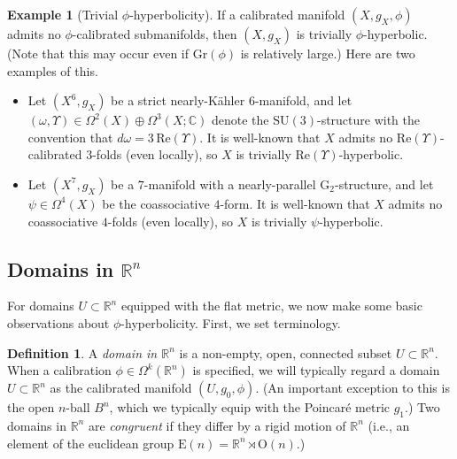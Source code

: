 \documentclass[11pt]{article}
\newcommand{\SU}{\mathrm{SU}}
\newcommand{\G}{\mathrm{G}}
\newcommand{\R}{\mathbb{R}}
\newcommand{\C}{\mathbb{C}}
\theoremstyle{definition}
\newtheorem{defn}[thm]{Definition}
\newtheorem{example}[thm]{Example}
\numberwithin{equation}{section}
\begin{document}
\begin{example}[Trivial $\phi$-hyperbolicity] If a calibrated manifold $(X, g_X, \phi)$ admits no $\phi$-calibrated submanifolds, then $(X,g_X)$ is trivially $\phi$-hyperbolic.  (Note that this may occur even if $\mathrm{Gr}(\phi)$ is relatively large.)  Here are two examples of this.
\begin{itemize}
\item Let $(X^6, g_X)$ be a strict nearly-K\"{a}hler $6$-manifold, and let $(\omega, \Upsilon) \in \Omega^2(X) \oplus \Omega^3(X; \C)$ denote the $\SU(3)$-structure with the convention  that $d\omega = 3\,\mathrm{Re}(\Upsilon)$.  It is well-known that $X$ admits no $\mathrm{Re}(\Upsilon)$-calibrated $3$-folds (even locally), so $X$ is trivially $\mathrm{Re}(\Upsilon)$-hyperbolic.
\item Let $(X^7, g_X)$ be a $7$-manifold with a nearly-parallel $\G_2$-structure, and let $\psi \in \Omega^4(X)$ be the coassociative $4$-form.  It is well-known that $X$ admits no coassociative $4$-folds (even locally), so $X$ is trivially $\psi$-hyperbolic.
\end{itemize}
\end{example}

\subsection{Domains in $\R^n$}

\indent \indent For domains $U \subset \R^n$ equipped with the flat metric, we now make some basic observations about $\phi$-hyperbolicity.  First, we set terminology.

\begin{defn} A \emph{domain in $\R^n$} is a non-empty, open, connected subset $U \subset \R^n$.  When a calibration $\phi \in \Omega^k(\R^n)$ is specified, we will typically regard a domain $U \subset \R^n$ as the calibrated manifold $(U, g_0, \phi)$.  (An important exception to this is the open $n$-ball $B^n$, which we typically equip with the Poincar\'{e} metric $g_1$.)  Two domains in $\R^n$ are \emph{congruent} if they differ by a rigid motion of $\R^n$ (i.e., an element of the euclidean group $\mathrm{E}(n) = \R^n \rtimes \mathrm{O}(n)$.)
\end{defn}
\end{document}
